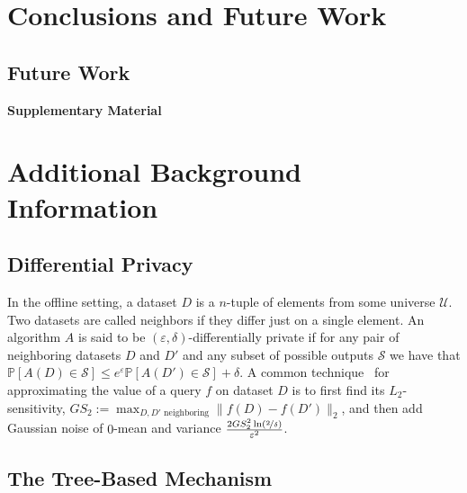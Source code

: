 \documentclass{article}
\renewcommand{\Pr}{\mathds{P}}
\begin{document}
\section{Conclusions and Future Work}
\label{sec:conclusions}

\subsection{Future Work}
\label{sec:future-work}




{\small}


\cleardoublepage
\appendix
{}
{}
\begin{center}
  \LARGE\bf Supplementary Material
\end{center}


\section{Additional Background Information}
\label{apx_sec:more_background}

\subsection{Differential Privacy}
\label{apx_subsec:DP}

In the offline setting, a dataset $D$ is a $n$-tuple of elements from some universe $\mathcal{U}$. Two datasets are called neighbors if they differ just on a single element. An algorithm $A$ is said to be $(\varepsilon,\delta)$-differentially private if for any pair of neighboring datasets $D$ and $D'$ and any subset of possible outputs $\mathcal{S}$ we have that $\Pr[A(D)\in\mathcal{S}]\leq e^\varepsilon\Pr[A(D')\in\mathcal{S}] + \delta$. A common technique~\cite{DworkOurData2006} for approximating the value of a query $f$ on dataset $D$ is to first find its $L_2$-sensitivity, $GS_2 :=\max_{D,D'\textrm{ neighboring}} \|f(D)-f(D')\|_2$, and then add Gaussian noise of $0$-mean and variance $\tfrac{2GS_2^2\ln(\nicefrac 2 \delta)}{\varepsilon^2}$.

\subsection{The Tree-Based Mechanism}
\end{document}
